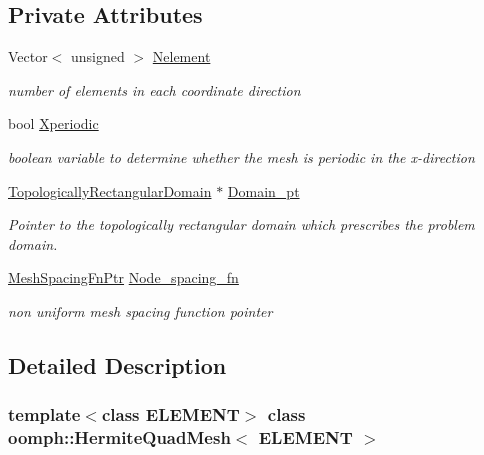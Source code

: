 \subsection*{Private Attributes}
\begin{DoxyCompactItemize}
\item 
Vector$<$ unsigned $>$ \hyperlink{classoomph_1_1HermiteQuadMesh_a0d02ca1a2769955ce57f09616195bd27}{Nelement}
\begin{DoxyCompactList}\small\item\em number of elements in each coordinate direction \end{DoxyCompactList}\item 
bool \hyperlink{classoomph_1_1HermiteQuadMesh_af1c2c974dc0d2e599b6bbe3921c5bb77}{Xperiodic}
\begin{DoxyCompactList}\small\item\em boolean variable to determine whether the mesh is periodic in the x-\/direction \end{DoxyCompactList}\item 
\hyperlink{classoomph_1_1TopologicallyRectangularDomain}{Topologically\+Rectangular\+Domain} $\ast$ \hyperlink{classoomph_1_1HermiteQuadMesh_af6bae1864691e8fe94d7c61995ae560a}{Domain\+\_\+pt}
\begin{DoxyCompactList}\small\item\em Pointer to the topologically rectangular domain which prescribes the problem domain. \end{DoxyCompactList}\item 
\hyperlink{classoomph_1_1HermiteQuadMesh_abebf4806b300591f976398404ed0ef3f}{Mesh\+Spacing\+Fn\+Ptr} \hyperlink{classoomph_1_1HermiteQuadMesh_a3b3cc55576538fc29e6975def870536f}{Node\+\_\+spacing\+\_\+fn}
\begin{DoxyCompactList}\small\item\em non uniform mesh spacing function pointer \end{DoxyCompactList}\end{DoxyCompactItemize}


\subsection{Detailed Description}
\subsubsection*{template$<$class E\+L\+E\+M\+E\+NT$>$\newline
class oomph\+::\+Hermite\+Quad\+Mesh$<$ E\+L\+E\+M\+E\+N\+T $>$}


